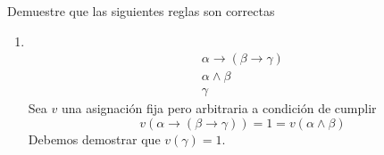 \begin{ejercicio*}
    Demuestre que las siguientes reglas son correctas

    \begin{enumerate}
        \item \ 
    \begin{equation*}
    \begin{array}{c}
        \alpha\rightarrow(\beta\rightarrow\gamma)\\
        \alpha\land\beta \\
        \hline 
        \gamma
    \end{array}
    \end{equation*}
    Sea $v$ una asignación fija pero arbitraria a condición de cumplir
    \begin{equation*}
        v(\alpha\rightarrow(\beta\rightarrow\gamma)) = 1 = v(\alpha\land \beta)
    \end{equation*}
    Debemos demostrar que $v(\gamma)=1$.


\end{enumerate}
\end{ejercicio*}
